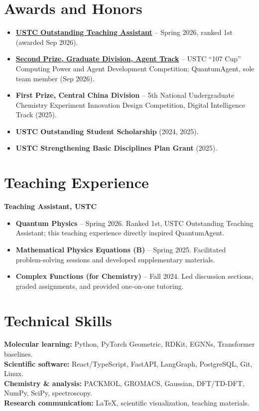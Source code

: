 \documentclass[11pt,a4paper]{article}
\begin{document}
\section{Awards and Honors}
\begin{itemize}
    \item \href{https://www.teach.ustc.edu.cn/?attachment_id=20606}{\textbf{USTC Outstanding Teaching Assistant}} -- Spring 2026, ranked 1st (awarded Sep 2026).
    \item \href{https://www.teach.ustc.edu.cn/notice/notice-info/20582.html}{\textbf{Second Prize, Graduate Division, Agent Track}} -- USTC ``107 Cup'' Computing Power and Agent Development Competition; QuantumAgent, sole team member (Sep 2026).
    \item \textbf{First Prize, Central China Division} -- 5th National Undergraduate Chemistry Experiment Innovation Design Competition, Digital Intelligence Track (2025).
    \item \textbf{USTC Outstanding Student Scholarship} (2024, 2025).
    \item \textbf{USTC Strengthening Basic Disciplines Plan Grant} (2025).
\end{itemize}

\section{Teaching Experience}
\textbf{Teaching Assistant, USTC}
\begin{itemize}
    \item \textbf{Quantum Physics} -- Spring 2026. Ranked 1st, USTC Outstanding Teaching Assistant; this teaching experience directly inspired QuantumAgent.
    \item \textbf{Mathematical Physics Equations (B)} -- Spring 2025. Facilitated problem-solving sessions and developed supplementary materials.
    \item \textbf{Complex Functions (for Chemistry)} -- Fall 2024. Led discussion sections, graded assignments, and provided one-on-one tutoring.
\end{itemize}

\section{Technical Skills}
\textbf{Molecular learning:} Python, PyTorch Geometric, RDKit, EGNNs, Transformer baselines.\\
\textbf{Scientific software:} React/TypeScript, FastAPI, LangGraph, PostgreSQL, Git, Linux.\\
\textbf{Chemistry \& analysis:} PACKMOL, GROMACS, Gaussian, DFT/TD-DFT, NumPy, SciPy, spectroscopy.\\
\textbf{Research communication:} LaTeX, scientific visualization, teaching materials.
\end{document}
